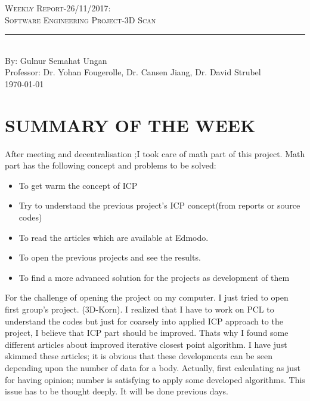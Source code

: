 \documentclass[aps,letterpaper,11pt]{revtex4}
\newcommand{\labno}{Weekly Report-26/11/2017}
\newcommand{\labtitle}{Software Engineering Project-3D Scan}
\newcommand{\authorname}{Gulnur Semahat Ungan}
\newcommand{\professor}{Dr. Yohan Fougerolle, Dr. Cansen Jiang, Dr. David Strubel}
\begin{document}
  
\begin{titlepage}
\begin{center}
{\LARGE \textsc{\labno:} \\ \vspace{4pt}}
{\Large \textsc{\labtitle} \\ \vspace{4pt}} 
\rule[13pt]{\textwidth}{1pt} \\ \vspace{150pt}
{\large By: \authorname \\ \vspace{10pt}
Professor: \professor \\ \vspace{10pt}
\today}
\end{center}




\end{titlepage}%
\newpage

\section{SUMMARY OF THE WEEK}
After meeting and decentralisation ;I took care of math part of this project. 
Math part has the following concept and problems to be solved:

\begin{itemize}
\item To get warm the concept of ICP
\item Try to understand the previous project's ICP concept(from reports or source codes)
\item To read the articles which are available at Edmodo.
\item To open the previous projects and see the results.
\item To find a more advanced solution for the projects as development of them
\end{itemize}
For the challenge of opening the project on my computer. I just tried to open first group's project. (3D-Korn). I realized that I have to work on PCL to understand the codes but just for coarsely into applied ICP approach to the project, I believe that ICP part should be improved. Thats why I found some different articles about improved iterative closest point algorithm. I have just skimmed these articles; it is obvious that these developments can be seen depending upon the number of data for a body. Actually, first calculating as just for having opinion; number is satisfying to apply some developed algorithms. This issue has to be thought deeply. It will be done previous days.
\end{document}
